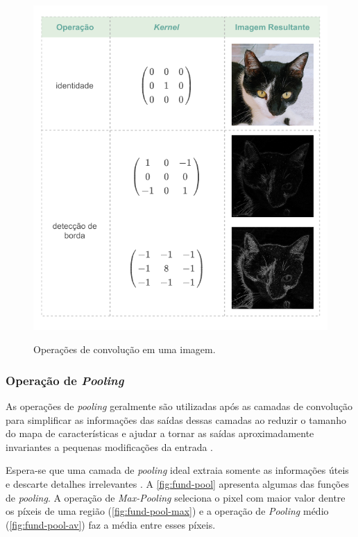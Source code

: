 \begin{figure}[H] %
  \centering
  \caption{Operações de convolução em uma imagem.}
  \includegraphics[scale=1.1]{img/img-fundamentacao-fifits.pdf}
  \label{fig:fund-fifits}
\end{figure}

\subsubsection{Operação de \textit{Pooling}} \label{cap:fund-ia-rn-conv-pool}
As operações de \textit{pooling} geralmente são utilizadas após as camadas de convolução para simplificar as informações das saídas dessas camadas \cite{ref:Nielsen} ao reduzir o tamanho do mapa de características \cite{ref:Gholamalinezhad-Khosravi} e ajudar a tornar as saídas aproximadamente invariantes a pequenas modificações da entrada \cite{ref:Goodfellow-Bengio-Courville}.

Espera-se que uma camada de \textit{pooling} ideal extraia somente as informações úteis e descarte detalhes irrelevantes \cite{ref:Gholamalinezhad-Khosravi}. A \autoref{fig:fund-pool} apresenta algumas das funções de \textit{pooling}. A operação de \textit{Max-Pooling} seleciona o pixel com maior valor dentre os píxeis de uma região (\autoref{fig:fund-pool-max}) e a operação de \textit{Pooling} médio (\autoref{fig:fund-pool-av}) faz a média entre esses píxeis.

